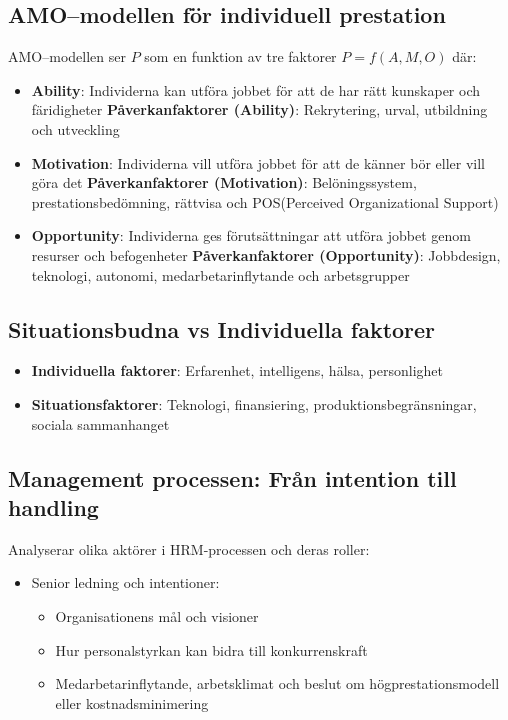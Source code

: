 \documentclass[12pt,a4paper]{article}
\begin{document}
\subsection{AMO--modellen för individuell prestation}
AMO--modellen ser $P$ som en funktion av tre faktorer $P = f(A,M,O)$ där:
\begin{itemize}
    \item \textbf{Ability}: Individerna kan utföra jobbet för att de har rätt kunskaper och färidigheter
          \subitem \textbf{Påverkanfaktorer (Ability)}: Rekrytering, urval, utbildning och utveckling
    \item \textbf{Motivation}: Individerna vill utföra jobbet för att de känner bör eller vill göra det
          \subitem \textbf{Påverkanfaktorer (Motivation)}: Belöningssystem, prestationsbedömning, rättvisa och POS(Perceived Organizational Support)
    \item \textbf{Opportunity}: Individerna ges förutsättningar att utföra jobbet genom resurser och befogenheter
          \subitem \textbf{Påverkanfaktorer (Opportunity)}: Jobbdesign, teknologi, autonomi, medarbetarinflytande och arbetsgrupper
\end{itemize}

\subsection{Situationsbudna vs Individuella faktorer}
\begin{itemize}
    \item \textbf{Individuella faktorer}: Erfarenhet, intelligens, hälsa, personlighet
    \item \textbf{Situationsfaktorer}: Teknologi, finansiering, produktionsbegränsningar, sociala sammanhanget
\end{itemize}

\subsection{Management processen: Från intention till handling}
Analyserar olika aktörer i HRM-processen och deras roller:
\begin{itemize}
    \item Senior ledning och intentioner:
          \begin{itemize}
              \item Organisationens mål och visioner
              \item Hur personalstyrkan kan bidra till konkurrenskraft
              \item Medarbetarinflytande, arbetsklimat och beslut om högprestationsmodell eller kostnadsminimering
          \end{itemize}
\end{itemize}
\end{document}
